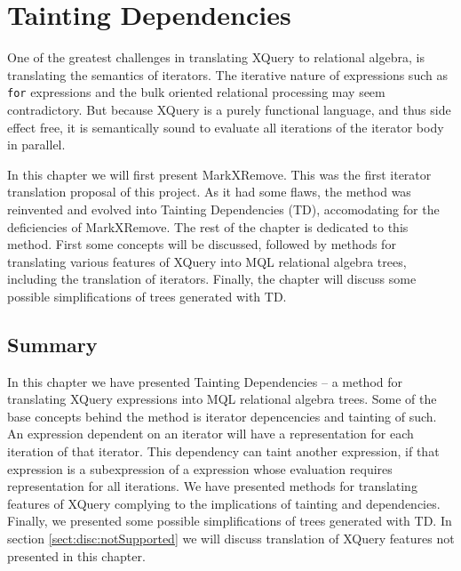 \chapter{Tainting Dependencies}
\label{sect:translation}
\label{chapter:translation}

One of the greatest challenges in translating XQuery to relational algebra, is translating the semantics of
iterators. The iterative nature of expressions such as \texttt{for} expressions and the bulk oriented relational
processing may seem contradictory. But because XQuery is a purely functional language, and thus side effect free,
it is semantically sound to evaluate all iterations of the iterator body in
parallel.

In this chapter we will first present MarkXRemove. This was the first iterator translation proposal of this
project. As it had some flaws, the method was reinvented and evolved into Tainting Dependencies (TD), accomodating
for the deficiencies of MarkXRemove. The rest of the chapter is dedicated to this method. First some concepts will
be discussed, followed by methods for translating various features of XQuery into MQL relational algebra trees,
including the translation of iterators. Finally, the chapter will discuss some possible simplifications of trees
generated with TD.













\section{Summary}
\label{sect:trans:summary}

In this chapter we have presented Tainting Dependencies -- a method for translating XQuery expressions into MQL
relational algebra trees. Some of the base concepts behind the method is iterator depencencies and tainting of
such. An expression dependent on an iterator will have a representation for each iteration of that iterator. This
dependency can taint another expression, if that expression is a subexpression of a expression whose evaluation
requires representation for all iterations. We have presented methods for translating features of XQuery complying
to the implications of tainting and dependencies. Finally, we presented some possible simplifications of trees
generated with TD. In section \ref{sect:disc:notSupported} we will discuss translation of XQuery features not
presented in this chapter.